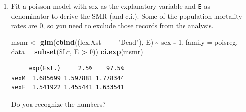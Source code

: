 \documentclass[
]{book}
\newenvironment{Shaded}{\begin{snugshade}}{\end{snugshade}}
\newcommand{\AttributeTok}[1]{\textcolor[rgb]{0.13,0.29,0.53}{#1}}
\newcommand{\DecValTok}[1]{\textcolor[rgb]{0.00,0.00,0.81}{#1}}
\newcommand{\FunctionTok}[1]{\textcolor[rgb]{0.13,0.29,0.53}{\textbf{#1}}}
\newcommand{\NormalTok}[1]{#1}
\newcommand{\OtherTok}[1]{\textcolor[rgb]{0.56,0.35,0.01}{#1}}
\newcommand{\SpecialCharTok}[1]{\textcolor[rgb]{0.81,0.36,0.00}{\textbf{#1}}}
\newcommand{\StringTok}[1]{\textcolor[rgb]{0.31,0.60,0.02}{#1}}
\providecommand{\tightlist}{%
  \setlength{\itemsep}{0pt}\setlength{\parskip}{0pt}}
\theoremstyle{definition}
\theoremstyle{definition}
\theoremstyle{definition}
\theoremstyle{definition}
\theoremstyle{remark}
\begin{document}
\begin{enumerate}
\begin{Shaded}
\begin{Highlighting}[]
\FunctionTok{dim}\NormalTok{(SLr)}
\end{Highlighting}
\end{Shaded}

\begin{verbatim}
[1] 118454     17
\end{verbatim}

  This merge (remember to \texttt{?merge}!) only takes rows that have
  information from both datasets, hence the slightly fewer rows in
  \texttt{SLr} than in \texttt{SL}.

  \begin{itemize}
  \tightlist
  \item
    Compute the expected number of deaths as the person-time
    multiplied (\texttt{lex.dur}) by the corresponding population rate, and put it in a
    new variable, \texttt{E}, say (\texttt{E}xpected). Use \texttt{stat.table}
    to make a table of observed, expected and the ratio (SMR) by age
    (suitably grouped, look for \texttt{cut}) and sex.
  \end{itemize}
\item
  Fit a poisson model with sex as the explanatory variable and
  \texttt{E} as denominator to derive the SMR (and c.i.).
  Some of the population mortality rates are 0, so you need to exclude
  those records from the analysis.

\begin{Shaded}
\begin{Highlighting}[]
\NormalTok{msmr }\OtherTok{\textless{}{-}} \FunctionTok{glm}\NormalTok{(}\FunctionTok{cbind}\NormalTok{((lex.Xst }\SpecialCharTok{==} \StringTok{"Dead"}\NormalTok{), E) }\SpecialCharTok{\textasciitilde{}}\NormalTok{ sex }\SpecialCharTok{{-}} \DecValTok{1}\NormalTok{,}
            \AttributeTok{family =}\NormalTok{ poisreg,}
              \AttributeTok{data =} \FunctionTok{subset}\NormalTok{(SLr, E }\SpecialCharTok{\textgreater{}} \DecValTok{0}\NormalTok{))}
\FunctionTok{ci.exp}\NormalTok{(msmr)}
\end{Highlighting}
\end{Shaded}

\begin{verbatim}
     exp(Est.)     2.5%    97.5%
sexM  1.685699 1.597881 1.778344
sexF  1.541922 1.455441 1.633541
\end{verbatim}

  Do you recognize the numbers?


\end{enumerate}
\end{document}
